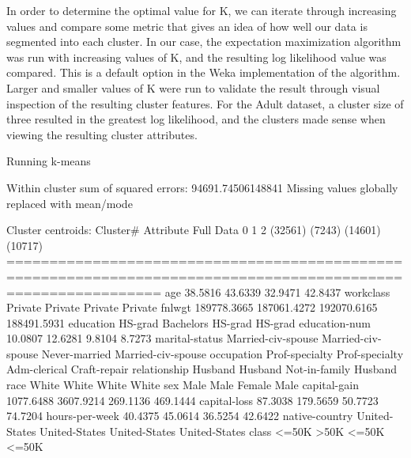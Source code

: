 \documentclass{sig-alternate}
\begin{document}

In order to determine the optimal value for K, we can iterate through increasing values and compare some metric that gives an idea of how well our data is segmented into each cluster. In our case, the expectation maximization algorithm was run with increasing values of K, and the resulting log likelihood value was compared. This is a default option in the Weka implementation of the algorithm. Larger and smaller values of K were run to validate the result through visual inspection of the resulting cluster features. For the Adult dataset, a cluster size of three resulted in the greatest log likelihood, and the clusters made sense when viewing the resulting cluster attributes.

\tiny
\begin{verbbox}
Running k-means

Within cluster sum of squared errors: 94691.74506148841
Missing values globally replaced with mean/mode

Cluster centroids:
                                                              Cluster#
Attribute                                Full Data                   0                   1                   2
                                           (32561)              (7243)             (14601)             (10717)
==============================================================================================================
age                                        38.5816             43.6339             32.9471             42.8437
workclass                                  Private             Private             Private             Private
fnlwgt                                 189778.3665         187061.4272         192070.6165         188491.5931
education                                  HS-grad           Bachelors             HS-grad             HS-grad
education-num                              10.0807             12.6281              9.8104              8.7273
marital-status                  Married-civ-spouse  Married-civ-spouse       Never-married  Married-civ-spouse
occupation                          Prof-specialty      Prof-specialty        Adm-clerical        Craft-repair
relationship                               Husband             Husband       Not-in-family             Husband
race                                         White               White               White               White
sex                                           Male                Male              Female                Male
capital-gain                             1077.6488           3607.9214            269.1136            469.1444
capital-loss                               87.3038            179.5659             50.7723             74.7204
hours-per-week                             40.4375             45.0614             36.5254             42.6422
native-country                       United-States       United-States       United-States       United-States
class                                        <=50K                >50K               <=50K               <=50K
\end{verbbox}
\normalsize
\end{document}
